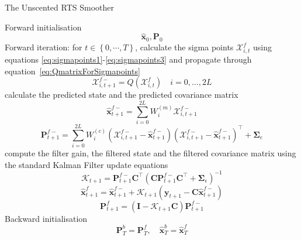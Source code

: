 \documentclass[twocolumn,11pt,a4paper]{article}		%
\begin{document}
\begin{algorithm}
	\begin{small}
	\caption{The Unscented RTS Smoother}\label{UKFAlgorithm} 
	\begin{algorithmic}[1] 
		\State Forward initialisation 
		\begin{equation*}
		 \hat{\mathbf x}_0, \mathbf P_0 
		\end{equation*}
		\State Forward iteration: for $t \in \left\lbrace 0,\cdots, T\right\rbrace $,
		calculate the sigma points $\mathcal X_{i,t}^f$ using equations \ref{eq:sigmapoints1}-\ref{eq:sigmapoints3} and propagate through equation~\ref{eq:QmatrixForSigmapoints}
		\begin{equation*}
			\mathcal X_{i,t+1}^{f-}=Q(\mathcal X_{i,t}^f) \quad i=0, \dots, 2L
		\end{equation*}
		calculate the predicted state and the predicted covariance matrix
		\begin{equation*}
			\hat{\mathbf x}_{t+1}^{f-}=\sum_{i=0}^{2L} W_i^{(m)}\mathcal X_{i,t+1}^{f-} 
		\end{equation*}
		\begin{equation*}
			\mathbf P_{t +1}^{f-}=\sum_{i=0}^{2L} W_i^{(c)}(\mathcal X_{i,t+1}^{f-}-\hat{\mathbf x}_{t +1}^{f-})(\mathcal X_{i,t+1}^{f-}-\hat{\mathbf x}_{t +1}^{f-})^\top+\boldsymbol \Sigma_e 
		\end{equation*}
		compute the filter gain, the filtered state and the filtered covariance matrix using the standard Kalman Filter update equations
		\begin{equation*}
			\mathcal K_{t+1}=\mathbf P_{t +1}^{f-}\mathbf C ^\top(\mathbf C \mathbf P_{t +1}^{f-}\mathbf C ^\top+\boldsymbol \Sigma_{\epsilon})^{-1} 
		\end{equation*}
		\begin{equation*}
			\hat{\mathbf x}_{t+1}^{f}=\hat{\mathbf x}_{t+1}^{f-}+\mathcal K_{t+1}(\mathbf y_{t+1}-\mathbf C\hat{\mathbf x}_{t +1}^{f-}) 
		\end{equation*}
		\begin{equation*}
			\mathbf P_{t+1}^f=(\mathbf I - \mathcal K_{t+1}\mathbf C)\mathbf P_{t +1}^{f-} 
		\end{equation*}
		\State Backward initialisation 
		\begin{equation*}
			\mathbf P_T^b= \mathbf P_T^f, \quad \hat{\mathbf x}^b_T= \hat{\mathbf x}^f_T 
		\end{equation*}

\end{algorithmic}
\end{small}
\end{algorithm}
\end{document}
